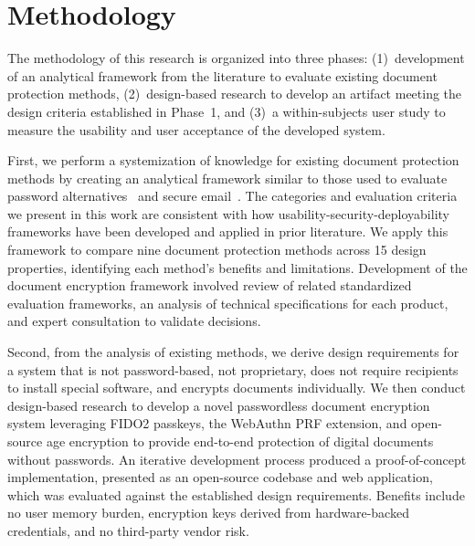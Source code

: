 \chapter{Methodology}
\label{ch:methodology}

The methodology of this research is organized into three phases: (1)~development of an analytical framework from the literature to evaluate existing document protection methods, (2)~design-based research to develop an artifact meeting the design criteria established in Phase~1, and (3)~a within-subjects user study to measure the usability and user acceptance of the developed system.

First, we perform a systemization of knowledge for existing document protection methods by creating an analytical framework similar to those used to evaluate password alternatives~\cite{bonneau_quest_2012} and secure email~\cite{borisov_sok_2021}. The categories and evaluation criteria we present in this work are consistent with how usability-security-deployability frameworks have been developed and applied in prior literature. We apply this framework to compare nine document protection methods across 15 design properties, identifying each method's benefits and limitations. Development of the document encryption framework involved review of related standardized evaluation frameworks, an analysis of technical specifications for each product, and expert consultation to validate decisions.

Second, from the analysis of existing methods, we derive design requirements for a system that is not password-based, not proprietary, does not require recipients to install special software, and encrypts documents individually. We then conduct design-based research to develop a novel passwordless document encryption system leveraging FIDO2 passkeys, the WebAuthn PRF extension, and open-source age encryption to provide end-to-end protection of digital documents without passwords. An iterative development process produced a proof-of-concept implementation, presented as an open-source codebase and web application, which was evaluated against the established design requirements. Benefits include no user memory burden, encryption keys derived from hardware-backed credentials, and no third-party vendor risk.

